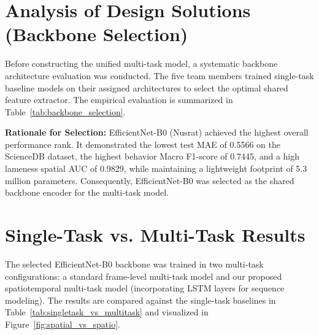 \section{Analysis of Design Solutions (Backbone Selection)}
Before constructing the unified multi-task model, a systematic backbone architecture evaluation was conducted. The five team members trained single-task baseline models on their assigned architectures to select the optimal shared feature extractor. The empirical evaluation is summarized in Table~\ref{tab:backbone_selection}.

\begin{table}[H]
\centering
\caption{Backbone Selection and Single-Task Baseline Performance Table}
\label{tab:backbone_selection}
\end{table}

\textbf{Rationale for Selection:} EfficientNet-B0 (Nusrat) achieved the highest overall performance rank. It demonstrated the lowest test MAE of 0.5566 on the ScienceDB dataset, the highest behavior Macro F1-score of 0.7445, and a high lameness spatial AUC of 0.9829, while maintaining a lightweight footprint of 5.3 million parameters. Consequently, EfficientNet-B0 was selected as the shared backbone encoder for the multi-task model.

\section{Single-Task vs. Multi-Task Results}
The selected EfficientNet-B0 backbone was trained in two multi-task configurations: a standard frame-level multi-task model and our proposed spatiotemporal multi-task model (incorporating LSTM layers for sequence modeling). The results are compared against the single-task baselines in Table~\ref{tab:singletask_vs_multitask} and visualized in Figure~\ref{fig:spatial_vs_spatio}.

